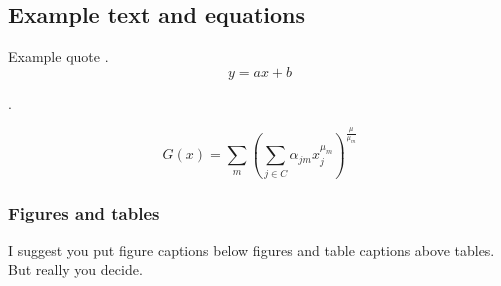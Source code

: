 
\subsection{Example text and equations}

Example quote \cite{bierlaire_theoretical_2006}.
\blindtext
\begin{equation}
y = ax + b
\end{equation}

\blindtext.

\begin{equation}
  G(x) = \sum_{m} \left( \sum_{j \in C} \alpha_{jm} x_j^{\mu_m} \right)^{\frac{\mu}{\mu_m}}
\end{equation}


\subsubsection{Figures and tables}

I suggest you put figure captions below figures and table captions above tables. But really you decide.
